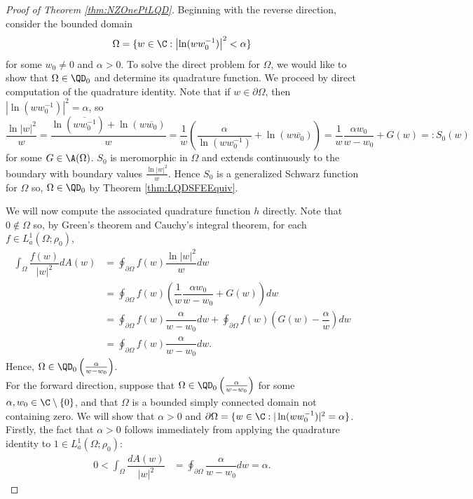 \documentclass{article}
\numberwithin{equation}{section}
\begin{document}
\begin{proof}[Proof of Theorem \ref{thm:NZOnePtLQD}]
Beginning with the reverse direction, consider the bounded domain
$$\Omega=\{w\in\C:\left|\ln(ww_0^{-1})\right|^2<\alpha\}$$
for some $w_0\neq0$ and $\alpha>0$. To solve the direct problem for $\Omega$, we would like to show that $\Omega\in\QD_0$ and determine its quadrature function. We proceed by direct computation of the quadrature identity. Note that if $w\in\partial\Omega$, then $\left|\ln(ww_0^{-1})\right|^2=\alpha$, so
$$\dfrac{\ln|w|^2}{w}=\dfrac{\ln(\overline{ww_0^{-1}})+\ln(w\overline{w_0})}{w}=\dfrac{1}{w}\left(\dfrac{\alpha}{\ln(ww_0^{-1})}+\ln(w\overline{w_0})\right)=\dfrac{1}{w}\dfrac{\alpha w_0}{w-w_0}+G(w)=:S_0(w)$$
for some $G\in\A(\Omega)$. $S_0$ is meromorphic in $\Omega$ and extends continuously to the boundary with boundary values $\frac{\ln|w|^2}{w}$. Hence $S_0$ is a generalized Schwarz function for $\Omega$ so, $\Omega\in\QD_0$ by Theorem \ref{thm:LQDSFEEquiv}. 

We will now compute the associated quadrature function $h$ directly. Note that $0\notin\Omega$ so, by Green's theorem and Cauchy's integral theorem, for each $f\in L_a^1(\Omega;\rho_0)$,
\begin{align*}
    \int_{\Omega}\dfrac{f(w)}{|w|^2}dA(w)&=\oint_{\partial\Omega}f(w)\dfrac{\ln|w|^2}{w}dw\\
    &=\oint_{\partial\Omega}f(w)\left(\dfrac{1}{w}\dfrac{\alpha w_0}{w-w_0}+G(w)\right)dw\\
    &=\oint_{\partial\Omega}f(w)\dfrac{\alpha}{w-w_0}dw+\oint_{\partial\Omega}f(w)\left(G(w)-\dfrac{\alpha}{w}\right)dw\\
    &=\oint_{\partial\Omega}f(w)\dfrac{\alpha}{w-w_0}dw.
\end{align*}
Hence, $\Omega\in\QD_0\left(\frac{\alpha}{w-w_0}\right)$.\\

For the forward direction, suppose that $\Omega\in\QD_0\left(\frac{\alpha}{w-w_0}\right)$ for some $\alpha,w_0\in\C\setminus\{0\}$, and that $\Omega$ is a bounded simply connected domain not containing zero. We will show that $\alpha>0$ and $\partial\Omega=\{w\in\C:|\ln(ww_0^{-1})|^2=\alpha\}$. Firstly, the fact that $\alpha>0$ follows immediately from applying the quadrature identity to $1\in L_a^1(\Omega;\rho_0)$:
\begin{align*}
    0<\int_{\Omega}\dfrac{dA(w)}{|w|^2}&=\oint_{\partial\Omega}\dfrac{\alpha}{w-w_0}dw=\alpha.
\end{align*}



\end{proof}
\end{document}
